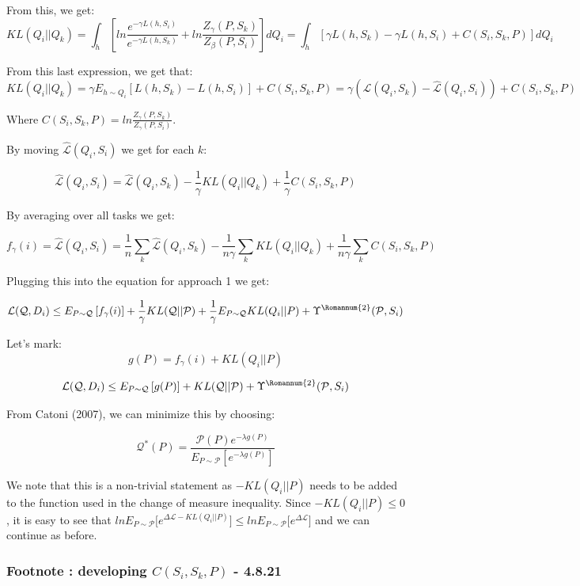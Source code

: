\documentclass[letterpaper]{article}
\theoremstyle{definition}
\begin{document}
From this, we get: 
$$KL(Q_i||Q_k)=\int_h \left [ ln\frac{e^{-\gamma L(h,S_i)}}{e^{-\gamma L(h,S_k)} }+ln \frac{Z_{\gamma}(P,S_k)}{Z_{\beta}(P,S_i)} \right ] dQ_i=\int_h \left [ \gamma L(h,S_k)-\gamma L(h,S_i) +C(S_i,S_k,P) \right ] dQ_i$$

From this last expression, we get that:
$$KL(Q_i||Q_k)=\gamma E_{h\sim Q_i}[L(h,S_k)-L(h,S_i)]+C(S_i,S_k,P)=\gamma (\hat{\mathcal{L}}(Q_i,S_k)-\hat{\mathcal{L}}(Q_i,S_i))+C(S_i,S_k,P)$$

Where $C(S_i,S_k,P)=ln\frac{Z_{\gamma}(P,S_k)}{ Z_{\gamma}(P,S_i)}$.

By moving $\hat{\mathcal{L}}(Q_i,S_i)$ we get for each $k$:

$$ \hat{\mathcal{L}}(Q_i,S_i)= \hat{\mathcal{L}}(Q_i,S_k) - \frac{1}{\gamma} KL(Q_i||Q_k) + \frac{1}{\gamma}C(S_i,S_k,P)$$

By averaging over all tasks we get:

$$ f_{\gamma}(i)=\hat{\mathcal{L}}(Q_i,S_i)= \frac{1}{n}\sum_k\hat{\mathcal{L}}(Q_i,S_k) - \frac{1}{n\gamma} \sum_k KL(Q_i||Q_k) + \frac{1}{n\gamma}\sum_k C(S_i,S_k,P)$$

Plugging this into the equation for approach 1 we get:

$$ \mathcal{L}(\mathcal{Q}, D_i)\leq E_{P\sim \mathcal{Q}} \left [ f_{\gamma}(i) \right ]+ \frac{1}{\gamma}KL(\mathcal{Q}||\mathcal{P})+\frac{1}{\gamma} E_{P\sim \mathcal{Q}}KL(Q_i||P)+\Upsilon^{\text{\Romannum{2}}}(\mathcal{P}, S_i)$$

Let's mark:
$$g(P)=f_{\gamma}(i)+ KL(Q_i||P)$$

$$ \mathcal{L}(\mathcal{Q}, D_i)\leq E_{P\sim \mathcal{Q}}\left [g(P) \right ] + KL(\mathcal{Q}||\mathcal{P})+\Upsilon^{\text{\Romannum{2}}}(\mathcal{P}, S_i)$$

From Catoni (2007), we can minimize this by choosing:

$$\mathcal{Q}^{*}(P)=\frac{\mathcal{P}(P) e^{-\lambda g(P)}}{E_{P\sim \mathcal{P}} \left [ e^{-\lambda g(P) } \right ]}$$

We note that this is a non-trivial statement as $-KL(Q_i||P)$ needs to be added to the function used in the change of measure inequality. Since $-KL(Q_i||P)\leq 0$, it is easy to see that $lnE_{P\sim \mathcal{P}}\bigl [e^{\Delta \mathcal{L}-KL(Q_i||P)}\bigr ]\leq lnE_{P\sim \mathcal{P}}\bigl [e^{\Delta \mathcal{L}}\bigr ]$ and we can continue as before.

\subsubsection*{Footnote : developing $C(S_i,S_k,P)$ - 4.8.21}
\end{document}
